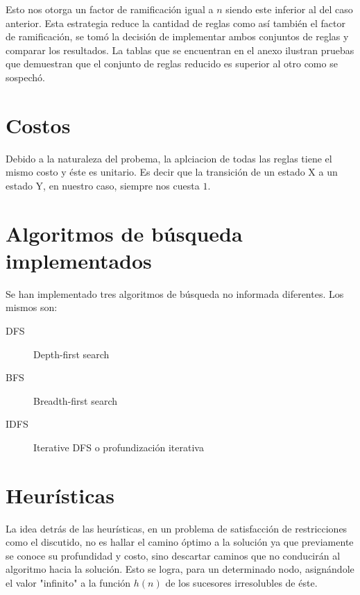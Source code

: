 \documentclass[%
	final,
	reprint,
	notitlepage,
	narroweqnarray,
	inline,
	twoside,
	invited
	]{ieee}
\begin{document}
\par Esto nos otorga un factor de ramificación igual a $n$ siendo este inferior al del caso anterior. Esta estrategia reduce la cantidad de reglas como así también el factor de ramificación, se tomó la decisión de implementar ambos conjuntos de reglas y comparar los resultados.
La tablas que se encuentran en el anexo ilustran pruebas que demuestran que el conjunto de reglas reducido es superior al otro como se sospechó.

\section{Costos}

\par Debido a la naturaleza del probema, la aplciacion de todas las reglas tiene el mismo costo y éste es unitario. Es decir que la transición de un estado X a un estado Y, en nuestro caso, siempre nos cuesta $1$.

\section{Algoritmos de búsqueda implementados}

\par Se han implementado tres algoritmos de búsqueda no informada diferentes. Los mismos son:

\begin{description}

\item[DFS]
Depth-first search

\item[BFS]
Breadth-first search

\item[IDFS]
Iterative DFS o profundización iterativa

\end{description}

\section{Heurísticas}

\par La idea detrás de las heurísticas, en un  problema de satisfacción de restricciones como el discutido, no es hallar el camino óptimo a la solución ya que previamente se conoce su profundidad y  costo,  sino descartar caminos que no conducirán al algoritmo hacia la solución. Esto se logra, para un determinado nodo, asignándole el valor "infinito" a la función $h(n)$ de los sucesores irresolubles de éste.\\
\end{document}
